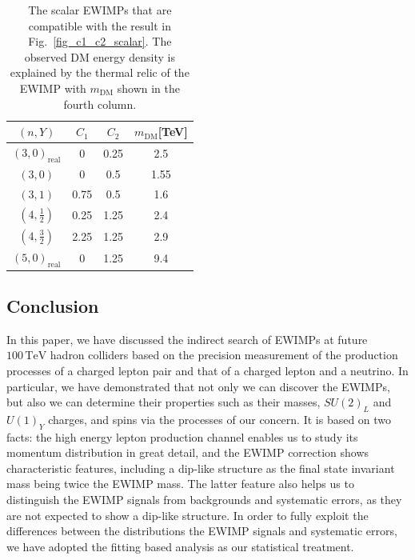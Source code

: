 \documentclass[12pt,twoside,book]{article}
\begin{document}
\begin{table}[t]
\centering
\begin{tabular}{|c|ccc|}
\hline
$(n, Y)$           & $C_1$ & $C_2$ & $m_\text{DM}$[TeV] \\ \hline\hline
$(3,0)_\text{real}$  &    0  &  0.25  & 2.5 \cite{Farina:2013mla}             \\
$(3,          0)$  &    0  & 0.5   & 1.55 \cite{DelNobile:2015bqo}              \\
$(3,          1)$  & 0.75  & 0.5   & 1.6 \cite{Farina:2013mla}               \\
$(4,\frac{1}{2})$  & 0.25  & 1.25  & 2.4 \cite{Farina:2013mla}             \\
$(4,\frac{3}{2})$  & 2.25  & 1.25  & 2.9 \cite{Farina:2013mla}             \\
$(5,0)_\text{real}$  &    0  &  1.25  & 9.4 \cite{Farina:2013mla}          \\
\hline
\end{tabular}
\caption{The scalar EWIMPs that are compatible with the result in Fig.~\ref{fig_c1_c2_scalar}. The observed DM energy density is explained by the
thermal relic of the EWIMP with $m_{\text{DM}}$ shown in the fourth column.}
\label{tab:minimalDM-for-950scalar-section}
\end{table}


\subsection{Conclusion}
\label{seq:conclusion}

In this paper, we have discussed the indirect search of EWIMPs at future
$100\,\mathrm{TeV}$ hadron colliders based on the precision measurement
of the production processes of a charged lepton pair and that of a
charged lepton and a neutrino.  In particular, we have demonstrated that
not only we can discover the EWIMPs, but also we can determine their
properties such as their masses, $SU(2)_L$ and $U(1)_Y$ charges, and
spins via the processes of our concern.  It is based on two facts: the
high energy lepton production channel enables us to study its momentum
distribution in great detail, and the EWIMP correction shows
characteristic features, including a dip-like structure as the final
state invariant mass being twice the EWIMP mass.  The latter feature
also helps us to distinguish the EWIMP signals from backgrounds and
systematic errors, as they are not expected to show a dip-like
structure.  In order to fully exploit the differences between the
distributions the EWIMP signals and systematic errors, we have adopted
the fitting based analysis as our statistical treatment.
\end{document}
